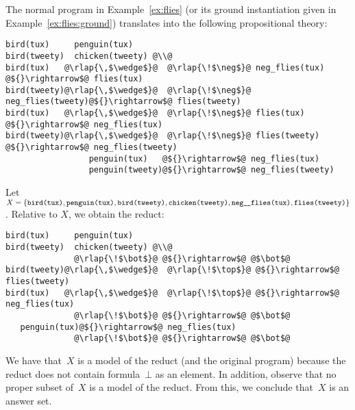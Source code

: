 \begin{example}\label{ex:semantics}
The normal program in Example~\ref{ex:flies}
(or its ground instantiation given in Example~\ref{ex:flies:ground})
translates into the following propositional theory:
%
\begin{lstlisting}[escapechar=@]
bird(tux)     penguin(tux)
bird(tweety)  chicken(tweety) @\\@
bird(tux)   @\rlap{\,$\wedge$}@  @\rlap{\!$\neg$}@ neg_flies(tux)   @${}\rightarrow$@ flies(tux)
bird(tweety)@\rlap{\,$\wedge$}@  @\rlap{\!$\neg$}@ neg_flies(tweety)@${}\rightarrow$@ flies(tweety)
bird(tux)   @\rlap{\,$\wedge$}@  @\rlap{\!$\neg$}@ flies(tux)       @${}\rightarrow$@ neg_flies(tux)
bird(tweety)@\rlap{\,$\wedge$}@  @\rlap{\!$\neg$}@ flies(tweety)    @${}\rightarrow$@ neg_flies(tweety)
                 penguin(tux)   @${}\rightarrow$@ neg_flies(tux)
                 penguin(tweety)@${}\rightarrow$@ neg_flies(tweety)
\end{lstlisting}
%
Let
$X=\{
\code{\pred{bird}(\const{tux})},
\code{\pred{penguin}(\const{tux})},
\code{\pred{bird}(\const{tweety})},
\code{\pred{chicken}(\const{tweety})},\linebreak[1]
\code{\pred{neg\mus flies}(\const{tux})},
\code{\pred{flies}(\const{tweety})}
\}$.
Relative to $X$, we obtain the reduct:
%
\begin{lstlisting}[escapechar=@]
bird(tux)     penguin(tux)
bird(tweety)  chicken(tweety) @\\@
              @\rlap{\!$\bot$}@ @${}\rightarrow$@ @$\bot$@
bird(tweety)@\rlap{\,$\wedge$}@  @\rlap{\!$\top$}@ @${}\rightarrow$@ flies(tweety)
bird(tux)   @\rlap{\,$\wedge$}@  @\rlap{\!$\top$}@ @${}\rightarrow$@ neg_flies(tux)
              @\rlap{\!$\bot$}@ @${}\rightarrow$@ @$\bot$@
   penguin(tux)@${}\rightarrow$@ neg_flies(tux)
              @\rlap{\!$\bot$}@ @${}\rightarrow$@ @$\bot$@
\end{lstlisting}
%
We have that~$X$ is a model of the reduct (and the original program) because
the reduct does not contain formula~$\bot$ as an element.
In addition, observe that no proper subset of~$X$ is a model of the reduct.
From this, we conclude that~$X$ is an answer set.


\end{example}

